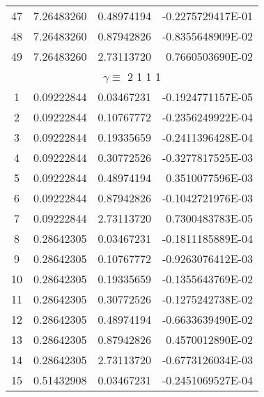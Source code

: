 \begin{longtable}{@{\extracolsep{\fill}}cllr@{}}
47  &  7.26483260  &  0.48974194  &  -0.2275729417E-01 \\

48  &  7.26483260  &  0.87942826  &  -0.8355648909E-02 \\

49  &  7.26483260  &  2.73113720  &   0.7660503690E-02 \\

\midrule

\multicolumn{4}{c}{ $\gamma \equiv $  2 1 1 1} \\

\midrule

1  &  0.09222844  &  0.03467231  &  -0.1924771157E-05 \\

2  &  0.09222844  &  0.10767772  &  -0.2356249922E-04 \\

3  &  0.09222844  &  0.19335659  &  -0.2411396428E-04 \\

4  &  0.09222844  &  0.30772526  &  -0.3277817525E-03 \\

5  &  0.09222844  &  0.48974194  &   0.3510077596E-03 \\

6  &  0.09222844  &  0.87942826  &  -0.1042721976E-03 \\

7  &  0.09222844  &  2.73113720  &   0.7300483783E-05 \\

8  &  0.28642305  &  0.03467231  &  -0.1811185889E-04 \\

9  &  0.28642305  &  0.10767772  &  -0.9263076412E-03 \\

10  &  0.28642305  &  0.19335659  &  -0.1355643769E-02 \\

11  &  0.28642305  &  0.30772526  &  -0.1275242738E-02 \\

12  &  0.28642305  &  0.48974194  &  -0.6633639490E-02 \\

13  &  0.28642305  &  0.87942826  &   0.4570012890E-02 \\

14  &  0.28642305  &  2.73113720  &  -0.6773126034E-03 \\

15  &  0.51432908  &  0.03467231  &  -0.2451069527E-04 \\


\end{longtable}
